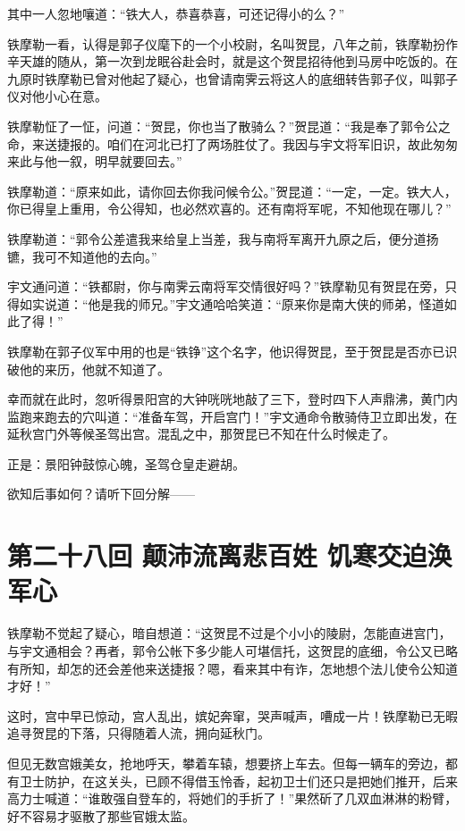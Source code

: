 \documentclass[12pt,oneside]{book}
\begin{document}
其中一人忽地嚷道：``铁大人，恭喜恭喜，可还记得小的么？''

铁摩勒一看，认得是郭子仪麾下的一个小校尉，名叫贺昆，八年之前，铁摩勒扮作辛天雄的随从，第一次到龙眠谷赴会时，就是这个贺昆招待他到马房中吃饭的。在九原时铁摩勒已曾对他起了疑心，也曾请南霁云将这人的底细转告郭子仪，叫郭子仪对他小心在意。

铁摩勒怔了一怔，问道：``贺昆，你也当了散骑么？''贺昆道：``我是奉了郭令公之命，来送捷报的。咱们在河北已打了两场胜仗了。我因与宇文将军旧识，故此匆匆来此与他一叙，明早就要回去。''

铁摩勒道：``原来如此，请你回去你我问候令公。''贺昆道：``一定，一定。铁大人，你已得皇上重用，令公得知，也必然欢喜的。还有南将军呢，不知他现在哪儿？''

铁摩勒道：``郭令公差遣我来给皇上当差，我与南将军离开九原之后，便分道扬镳，我可不知道他的去向。''

宇文通问道：``铁都尉，你与南霁云南将军交情很好吗？''铁摩勒见有贺昆在旁，只得如实说道：``他是我的师兄。''宇文通哈哈笑道：``原来你是南大侠的师弟，怪道如此了得！''

铁摩勒在郭子仪军中用的也是``铁铮''这个名字，他识得贺昆，至于贺昆是否亦已识破他的来历，他就不知道了。

幸而就在此时，忽听得景阳宫的大钟咣咣地敲了三下，登时四下人声鼎沸，黄门内监跑来跑去的穴叫道：``准备车驾，开启宫门！''宇文通命令散骑侍卫立即出发，在延秋宫门外等候圣驾出宫。混乱之中，那贺昆已不知在什么时候走了。

正是：景阳钟鼓惊心魄，圣驾仓皇走避胡。

欲知后事如何？请听下回分解------

\chapter{第二十八回 颠沛流离悲百姓
饥寒交迫涣军心}\label{ux7b2cux4e8cux5341ux516bux56de-ux98a0ux6c9bux6d41ux79bbux60b2ux767eux59d3-ux9965ux5bd2ux4ea4ux8febux6da3ux519bux5fc3}

铁摩勒不觉起了疑心，暗自想道：``这贺昆不过是个小小的陵尉，怎能直进宫门，与宇文通相会？再者，郭令公帐下多少能人可堪信托，这贺昆的底细，令公又已略有所知，却怎的还会差他来送捷报？嗯，看来其中有诈，怎地想个法儿使令公知道才好！''

这时，宫中早已惊动，宫人乱出，嫔妃奔窜，哭声喊声，嘈成一片！铁摩勒已无暇追寻贺昆的下落，只得随着人流，拥向延秋门。

但见无数宫娥美女，抢地呼天，攀着车辕，想要挤上车去。但每一辆车的旁边，都有卫士防护，在这关头，已顾不得借玉怜香，起初卫士们还只是把她们推开，后来高力士喊道：``谁敢强自登车的，将她们的手折了！''果然斫了几双血淋淋的粉臂，好不容易才驱散了那些官娥太监。
\end{document}
